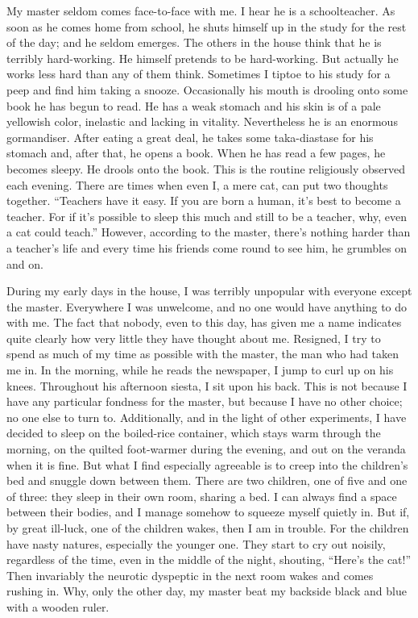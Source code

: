 \documentclass{book}
\begin{document}
My master seldom comes face-to-face with me. I hear he is a
schoolteacher. As soon as he comes home from school, he shuts himself up
in the study for the rest of the day; and he seldom emerges. The others
in the house think that he is terribly hard-working. He himself pretends
to be hard-working. But actually he works less hard than any of them
think. Sometimes I tiptoe to his study for a peep and find him taking a
snooze. Occasionally his mouth is drooling onto some book he has begun
to read. He has a weak stomach and his skin is of a pale yellowish
color, inelastic and lacking in vitality. Nevertheless he is an enormous
gormandiser. After eating a great deal, he takes some taka-diastase for
his stomach and, after that, he opens a book. When he has read a few
pages, he becomes sleepy. He drools onto the book. This is the routine
religiously observed each evening. There are times when even I, a mere
cat, can put two thoughts together. ``Teachers have it easy. If you are
born a human, it's best to become a teacher. For if it's possible to
sleep this much and still to be a teacher, why, even a cat could
teach.'' However, according to the master, there's nothing harder than a
teacher's life and every time his friends come round to see him, he
grumbles on and on.

During my early days in the house, I was terribly unpopular with
everyone except the master. Everywhere I was unwelcome, and no one would
have anything to do with me. The fact that nobody, even to this day, has
given me a name indicates quite clearly how very little they have
thought about me. Resigned, I try to spend as much of my time as
possible with the master, the man who had taken me in. In the morning,
while he reads the newspaper, I jump to curl up on his knees. Throughout
his afternoon siesta, I sit upon his back. This is not because I have
any particular fondness for the master, but because I have no other
choice; no one else to turn to. Additionally, and in the light of other
experiments, I have decided to sleep on the boiled-rice container, which
stays warm through the morning, on the quilted foot-warmer during the
evening, and out on the veranda when it is fine. But what I find
especially agreeable is to creep into the children's bed and snuggle
down between them. There are two children, one of five and one of three:
they sleep in their own room, sharing a bed. I can always find a space
between their bodies, and I manage somehow to squeeze myself quietly in.
But if, by great ill-luck, one of the children wakes, then I am in
trouble. For the children have nasty natures, especially the younger
one. They start to cry out noisily, regardless of the time, even in the
middle of the night, shouting, ``Here's the cat!'' Then invariably the
neurotic dyspeptic in the next room wakes and comes rushing in. Why,
only the other day, my master beat my backside black and blue with a
wooden ruler.
\end{document}
